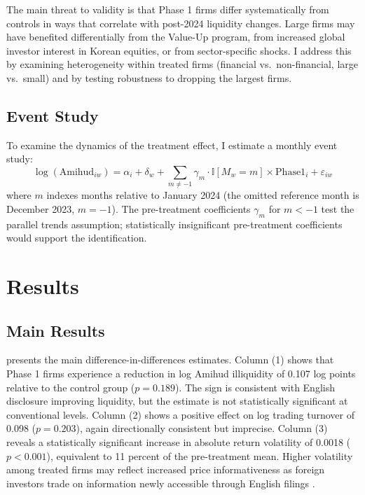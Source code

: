 \documentclass[12pt]{article}
\newcommand{\ind}{\mathbb{I}}
\begin{document}
The main threat to validity is that Phase 1 firms differ systematically from controls in ways that correlate with post-2024 liquidity changes. Large firms may have benefited differentially from the Value-Up program, from increased global investor interest in Korean equities, or from sector-specific shocks. I address this by examining heterogeneity within treated firms (financial vs.\ non-financial, large vs.\ small) and by testing robustness to dropping the largest firms.

\subsection{Event Study}

To examine the dynamics of the treatment effect, I estimate a monthly event study:
\begin{equation}
\log(\text{Amihud}_{iw}) = \alpha_i + \delta_w + \sum_{m \neq -1} \gamma_m \cdot \ind[M_w = m] \times \text{Phase1}_i + \varepsilon_{iw}
\label{eq:es}
\end{equation}
where $m$ indexes months relative to January 2024 (the omitted reference month is December 2023, $m = -1$). The pre-treatment coefficients $\gamma_m$ for $m < -1$ test the parallel trends assumption; statistically insignificant pre-treatment coefficients would support the identification.


\section{Results}

\subsection{Main Results}



 presents the main difference-in-differences estimates. Column (1) shows that Phase 1 firms experience a reduction in log Amihud illiquidity of 0.107 log points relative to the control group ($p = 0.189$). The sign is consistent with English disclosure improving liquidity, but the estimate is not statistically significant at conventional levels. Column (2) shows a positive effect on log trading turnover of 0.098 ($p = 0.203$), again directionally consistent but imprecise. Column (3) reveals a statistically significant increase in absolute return volatility of 0.0018 ($p < 0.001$), equivalent to 11 percent of the pre-treatment mean. Higher volatility among treated firms may reflect increased price informativeness as foreign investors trade on information newly accessible through English filings \citep{kyle1985}.
\end{document}
